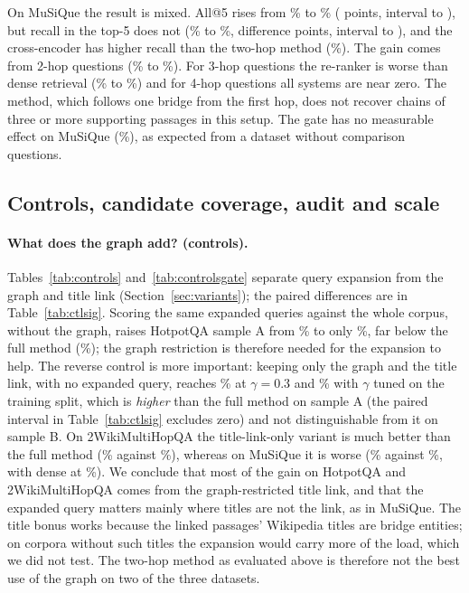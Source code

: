 \documentclass[a4paper,fleqn]{cas-sc}
\begin{document}
On MuSiQue the result is mixed. All@5 rises from \ExtMQDenseAll\% to \ExtMQTwoAll\% (\ExtMQTwoVDenseAllD{} points, interval \ExtMQTwoVDenseAllLo{} to \ExtMQTwoVDenseAllHi{}), but recall in the top-5 does not (\ExtMQDenseRec\% to \ExtMQTwoRec\%, difference \ExtMQTwoVDenseRecD{} points, interval \ExtMQTwoVDenseRecLo{} to \ExtMQTwoVDenseRecHi{}), and the cross-encoder has higher recall than the two-hop method (\ExtMQCERec\%). The gain comes from 2-hop questions (\TypMQDenseTwohop\% to \TypMQTwoTwohop\%). For 3-hop questions the re-ranker is worse than dense retrieval (\TypMQDenseThreehop\% to \TypMQTwoThreehop\%) and for 4-hop questions all systems are near zero. The method, which follows one bridge from the first hop, does not recover chains of three or more supporting passages in this setup. The gate has no measurable effect on MuSiQue (\ExtMQGateAll\%), as expected from a dataset without comparison questions.

\subsection{Controls, candidate coverage, audit and scale}\label{sec:controls}
\paragraph{What does the graph add? (controls).}
Tables~\ref{tab:controls} and~\ref{tab:controlsgate} separate query expansion from the graph and title link (Section~\ref{sec:variants}); the paired differences are in Table~\ref{tab:ctlsig}. Scoring the same expanded queries against the whole corpus, without the graph, raises HotpotQA sample A from \CtlHADenseAll\% to only \CtlHAExpFAll\%, far below the full method (\CtlHATwoFAll\%); the graph restriction is therefore needed for the expansion to help. The reverse control is more important: keeping only the graph and the title link, with no expanded query, reaches \CtlHATitFAll\% at $\gamma=0.3$ and \CtlHATitTAll\% with $\gamma$ tuned on the training split, which is \emph{higher} than the full method on sample A (the paired interval in Table~\ref{tab:ctlsig} excludes zero) and not distinguishable from it on sample B. On 2WikiMultiHopQA the title-link-only variant is much better than the full method (\CtlTWTitTAll\% against \CtlTWTwoFAll\%), whereas on MuSiQue it is worse (\CtlMQTitTAll\% against \CtlMQTwoFAll\%, with dense at \CtlMQDenseAll\%). We conclude that most of the gain on HotpotQA and 2WikiMultiHopQA comes from the graph-restricted title link, and that the expanded query matters mainly where titles are not the link, as in MuSiQue. The title bonus works because the linked passages' Wikipedia titles are bridge entities; on corpora without such titles the expansion would carry more of the load, which we did not test. The two-hop method as evaluated above is therefore not the best use of the graph on two of the three datasets.
\end{document}
